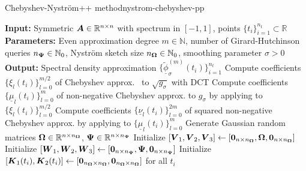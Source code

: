 \begin{algo}{Chebyshev-Nyström++ method}{nystrom-chebyshev-pp}
\begin{algorithmic}[1]
    \Statex \textbf{Input:} Symmetric $\boldsymbol{A} \in \mathbb{R}^{n \times n}$ with spectrum in $[-1, 1]$, points $\{t_i\}_{i=1}^{n_t} \subset \mathbb{R}$
    \Statex \textbf{Parameters:} Even approximation degree $m \in \mathbb{N}$, number of Girard-Hutchinson queries $n_{\boldsymbol{\Psi}} \in \mathbb{N}_0$, Nyström sketch size $n_{\boldsymbol{\Omega}} \in \mathbb{N}_0$,  smoothing parameter $\sigma > 0$
    \Statex \textbf{Output:} Spectral density approximation $\{\widetilde{\underline{\phi}}_{\sigma}^{(m)}(t_i)\}_{i=1}^{n_t}$
        \State Compute coefficients $\{\xi_l(t_i)\}_{l=0}^{m/2}$ of Chebyshev approx.~ to $\sqrt{g_{\sigma}}$ with DCT
        \State Compute coefficients $\{\underline{\mu}_l(t_i)\}_{l=0}^{m}$ of non-negative Chebyshev approx. to $g_{\sigma}$ by applying  to $\{\xi_l(t_i)\}_{l=0}^{m/2}$
        \State Compute coefficients $\{\underline{\nu}_l(t_i)\}_{l=0}^{2m}$ of squared non-negative Chebyshev approx. by applying  to $\{\underline{\mu}_l(t_i)\}_{l=0}^{m}$
    \EndFor
    \State Generate Gaussian random matrices $\boldsymbol{\Omega} \in \mathbb{R}^{n \times n_{\boldsymbol{\Omega}}}$, $\boldsymbol{\Psi} \in \mathbb{R}^{n \times n_{\boldsymbol{\Psi}}}$%
    \State Initialize $[\boldsymbol{V}_1, \boldsymbol{V}_2, \boldsymbol{V}_3] \gets [\boldsymbol{0}_{n \times n_{\boldsymbol{\Omega}}}, \boldsymbol{\boldsymbol{\Omega}}, \boldsymbol{0}_{n \times n_{\boldsymbol{\Omega}}}]$
    \State Initialize $[\boldsymbol{W}_1, \boldsymbol{W}_2, \boldsymbol{W}_3] \gets [\boldsymbol{0}_{n \times n_{\boldsymbol{\Psi}}}, \boldsymbol{\Psi}, \boldsymbol{0}_{n \times n_{\boldsymbol{\Psi}}}]$
    \State Initialize $[\boldsymbol{K}_1(t_i), \boldsymbol{K}_2(t_i)] \gets [\boldsymbol{0}_{n_{\boldsymbol{\Omega}} \times n_{\boldsymbol{\Omega}}}, \boldsymbol{0}_{n_{\boldsymbol{\Omega}} \times n_{\boldsymbol{\Omega}}}]$ for all $t_i$

\end{algorithmic}
\end{algo}
